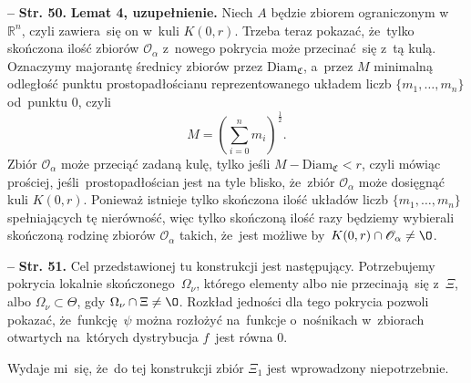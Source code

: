 \documentclass[a4paper,11pt]{article}
\newcommand{\ld}{\ldots}
\newcommand{\fr}{\frac}
\newcommand{\mr}{\mathrm}
\newcommand{\mb}{\mathbb}
\newcommand{\mc}{\mathcal}
\newcommand{\mf}{\mathfrak}
\newcommand{\al}{\alpha}
\newcommand{\Om}{\Omega}
\newcommand{\R}{\mb{R}}
\newcommand{\Rn}{\R^{ n }}
\newcommand{\Oc}{\mc{O}}
\newcommand{\subs}{\subset}
\newcommand{\Sum}{\sum\limits}
\newcommand{\tb}{\textbf}
\newcommand{\noi}{\noindent}
\newcommand{\start}{\noi \tb{--} {}}
\newcommand{\Str}[1]{\tb{Str. #1.}}
\begin{document}
\start \Str{50} \tb{Lemat 4, uzupełnienie.} Niech $A$ będzie zbiorem
ograniczonym w~$\Rn$, czyli zawiera~się on w~kuli $K( 0, r )$. Trzeba
teraz pokazać, że~tylko skończona ilość zbiorów $\Oc_{ \al }$ z~nowego
pokrycia może przecinać~się z~tą kulą. Oznaczymy majorantę średnicy
zbiorów przez $\mr{Diam}_{ \mf{ C } }$, a~przez $M$ minimalną
odległość punktu prostopadłościanu reprezentowanego układem liczb
$\{ m_{ 1 }, \ld, m_{ n } \}$ od~punktu $0$, czyli
\begin{displaymath}
  M = \left( \Sum_{ i = 0 }^{ n } m_{ i } \right)^{ \fr{ 1 }{ 2 } }.
\end{displaymath}
Zbiór $\Oc_{ \al }$ może przeciąć zadaną kulę, tylko jeśli
$M - \mr{Diam}_{ \mf{C} } < r$, czyli mówiąc prościej,
jeśli~prostopadłościan jest na tyle blisko, że~zbiór $\Oc_{ \al }$
może dosięgnąć kuli $K( 0, r )$. Ponieważ istnieje tylko skończona
ilość układów liczb $\{ m_{ 1 }, \ld, m_{ n } \}$ spełniających tę
nierówność, więc tylko skończoną ilość razy będziemy wybierali
skończoną rodzinę zbiorów $\Oc_{ \al }$ takich, że~jest możliwe
by~$K( 0, r ) \cap \Oc_{ \al } \neq \O$.


\start \Str{51} Cel przedstawionej tu konstrukcji jest następujący.
Potrzebujemy pokrycia lokalnie skończonego~$\Om_{ \nu }$, którego
elementy albo nie przecinają~się z~$\Xi$, albo
$\Om_{ \nu } \subs \Theta$, gdy $\Om_{ \nu } \cap \Xi \neq \O$.
Rozkład jedności dla tego pokrycia pozwoli pokazać, że~funkcję~$\psi$
można rozłożyć na~funkcje o~nośnikach w~zbiorach otwartych na~których
dystrybucja $f$~jest równa $0$.

Wydaje mi~się, że~do tej konstrukcji zbiór $\Xi_{ 1 }$ jest
wprowadzony niepotrzebnie.
\end{document}
